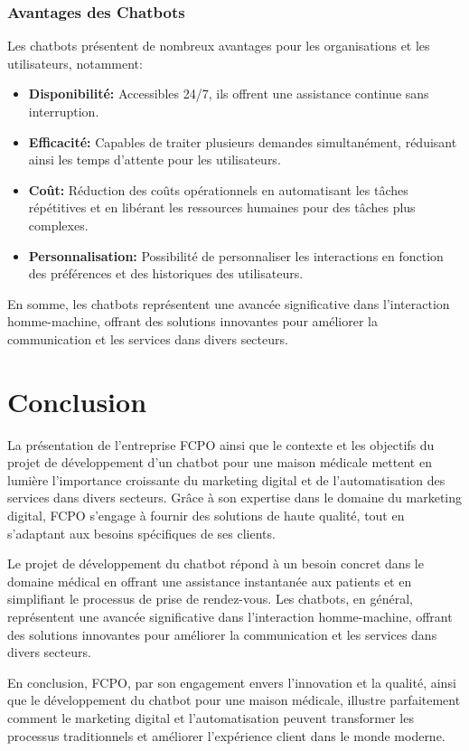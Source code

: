\subsubsection{Avantages des Chatbots}
\hspace{16pt}Les chatbots présentent de nombreux avantages pour les organisations et les utilisateurs, notamment:

\begin{itemize}
  \item \textbf{Disponibilité: }Accessibles 24/7, ils offrent une assistance continue sans interruption.
  \item \textbf{Efficacité: }Capables de traiter plusieurs demandes simultanément, réduisant ainsi les temps d'attente pour les utilisateurs.
  \item \textbf{Coût: }Réduction des coûts opérationnels en automatisant les tâches répétitives et en libérant les ressources humaines pour des tâches plus complexes.
  \item \textbf{Personnalisation: }Possibilité de personnaliser les interactions en fonction des préférences et des historiques des utilisateurs.
\end{itemize}

En somme, les chatbots représentent une avancée significative dans l'interaction homme-machine, offrant des solutions innovantes pour améliorer la communication et les services dans divers secteurs.




\newpage

\section*{Conclusion}

\hspace{16pt}La présentation de l'entreprise FCPO ainsi que le contexte et les objectifs du projet de développement d'un chatbot pour une maison médicale mettent en lumière l'importance croissante du marketing digital et de l'automatisation des services dans divers secteurs. Grâce à son expertise dans le domaine du marketing digital, FCPO s'engage à fournir des solutions de haute qualité, tout en s'adaptant aux besoins spécifiques de ses clients.

Le projet de développement du chatbot répond à un besoin concret dans le domaine médical en offrant une assistance instantanée aux patients et en simplifiant le processus de prise de rendez-vous. Les chatbots, en général, représentent une avancée significative dans l'interaction homme-machine, offrant des solutions innovantes pour améliorer la communication et les services dans divers secteurs.

En conclusion, FCPO, par son engagement envers l'innovation et la qualité, ainsi que le développement du chatbot pour une maison médicale, illustre parfaitement comment le marketing digital et l'automatisation peuvent transformer les processus traditionnels et améliorer l'expérience client dans le monde moderne.
